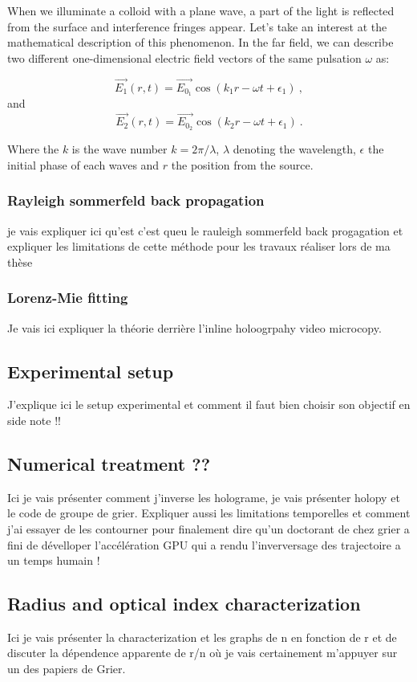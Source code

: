 When we illuminate a colloid with a plane wave, a part of the light is reflected from the surface and interference fringes appear. Let's take an interest at the mathematical description of this phenomenon. In the far field, we can describe two different one-dimensional electric field vectors of the same pulsation $\omega$ \cite{f_bohren_absorption_1998} as:

\begin{equation}
	\vec{E_1}(r, t) = \vec{E_{0_1}} \cos(k_1r - \omega t + \epsilon_1) ~,
\end{equation}
and
\begin{equation}
	\vec{E_2}(r, t) = \vec{E_{0_2}} \cos (k_2r - \omega t + \epsilon_1) ~.
\end{equation}



Where the $k$ is the wave number $k=2\pi/\lambda$, $\lambda$ denoting the wavelength, $\epsilon$ the initial phase of each waves and $r$ the position from the source.

\subsubsection{Rayleigh sommerfeld back propagation}
je vais expliquer ici qu'est c'est queu le rauleigh sommerfeld back progagation et expliquer les limitations de cette méthode pour les travaux réaliser lors de ma thèse
\subsubsection{Lorenz-Mie fitting}
Je vais ici expliquer la théorie derrière l'inline holoogrpahy video microcopy.

\subsection{Experimental setup}
J'explique ici le setup experimental et comment il faut bien choisir son objectif en side note !!

\subsection{Numerical treatment ??}

Ici je vais présenter comment j'inverse les holograme, je vais présenter holopy et le code de groupe de grier. Expliquer aussi les limitations temporelles et comment j'ai essayer de les contourner pour finalement dire qu'un doctorant de chez grier a fini de dévelloper l'accélération GPU qui a rendu l'inverversage des trajectoire a un temps humain !

\subsection{Radius and optical index characterization}


Ici je vais présenter la characterization et les graphs de n en fonction de r et de discuter la dépendence apparente de r/n où je vais certainement m'appuyer sur un des papiers de Grier. 

